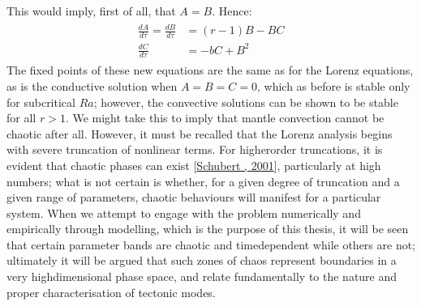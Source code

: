 \documentclass[letterpaper,10pt,english]{jupyterBook}
\begin{document}
\sphinxAtStartPar
This would imply, first of all, that \(A=B\). Hence:
\begin{equation*}
\begin{split} \begin{align*}
\frac{d A}{d \tau} = \frac{d B}{d \tau} &= \left( r - 1 \right) B - BC \\
\frac{d C}{d \tau} &= -bC + B^2
\end{align*} \end{split}
\end{equation*}
\sphinxAtStartPar
The fixed points of these new equations are the same as for the Lorenz equations, as is the conductive solution when \(A=B=C=0\), which as before is stable only for subcritical \(Ra\); however, the convective solutions can be shown to be stable for all \(r>1\). We might take this to imply that mantle convection cannot be chaotic after all. However, it must be recalled that the Lorenz analysis begins with severe truncation of non\sphinxhyphen{}linear terms. For higher\sphinxhyphen{}order truncations, it is evident that chaotic phases can exist {[}\hyperlink{cite.references:id663}{Schubert , 2001}{]}, particularly at high  numbers; what is not certain is whether, for a given degree of truncation and a given range of parameters, chaotic behaviours will manifest for a particular system. When we attempt to engage with the problem numerically and empirically through modelling, which is the purpose of this thesis, it will be seen that certain parameter bands are chaotic and time\sphinxhyphen{}dependent while others are not; ultimately it will be argued that such zones of chaos represent boundaries in a very high\sphinxhyphen{}dimensional phase space, and relate fundamentally to the nature and proper characterisation of tectonic modes.
\end{document}
